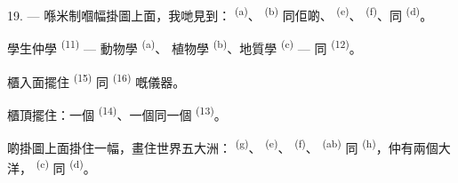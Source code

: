19. --- 喺米制嗰幅掛圖上面，我哋見到： \textsuperscript{(a)}、
 \textsuperscript{(b)} 同佢啲、
\textsuperscript{(e)}、 \textsuperscript{(f)}、同
 \textsuperscript{(d)}。

學生仲學 \textsuperscript{(11)} --- 動物學 \textsuperscript{(a)}、
植物學 \textsuperscript{(b)}、地質學 \textsuperscript{(c)} --- 同
\textsuperscript{(12)}。

櫃入面擺住 \textsuperscript{(15)} 同 \textsuperscript{(16)}
嘅儀器。

櫃頂擺住：一個 \textsuperscript{(14)}、一個同一個
 \textsuperscript{(13)}。

啲掛圖上面掛住一幅，畫住世界五大洲：
\textsuperscript{(g)}、 \textsuperscript{(e)}、
\textsuperscript{(f)}、 \textsuperscript{(ab)} 同
\textsuperscript{(h)}，仲有兩個大洋， \textsuperscript{(c)} 同
 \textsuperscript{(d)}。
\VUsaut{6.0mm}
\VUfilet{22mm}
